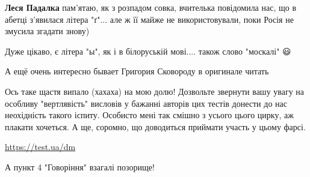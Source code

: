 \begin{itemize}
\begin{itemize}
 
\textbf{Леся Падалка} пам'ятаю, як з розпадом совка, вчителька повідомила нас,
що в абетці з'явилася літера "ґ"... але ж її майже не використовували, поки
Росія не змусила згадати знову)
\end{itemize}

 
Дуже цікаво, є літера "ы", як і в білоруській мові.... також слово "москалі" 😃


 
А ещё очень интересно бывает Григория Сковороду в оригинале читать


 

Ось таке щастя випало (хахаха) на мою долю! Дозвольте звернути вашу увагу на
особливу "вертлявість" висловів у бажанні авторів цих тестів донести до нас
неохідність такого іспиту. Особисто мені так смішно з усього цього цирку, аж
плакати хочеться. А ще, соромно, що доводиться приймати участь у цьому фарсі.\par

\url{https://test.ua/dm}

\begin{itemize}
 
А пункт 4 "Говоріння" взагалі позорище!
\end{itemize}


\end{itemize}
